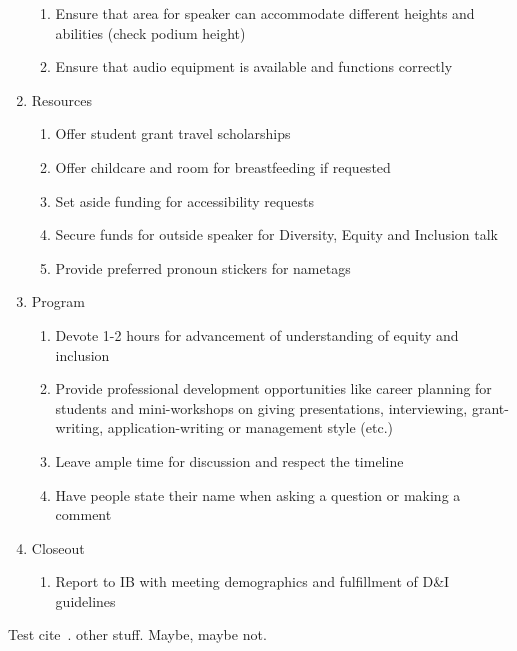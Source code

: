 \documentclass{article}
\begin{document}
\begin{enumerate}
\begin{enumerate}[label=\alph*.]
      \item Ensure that area for speaker can accommodate different heights and abilities (check podium height)
      \item Ensure that audio equipment is available and functions correctly
    \end{enumerate}
    \item Resources
    \begin{enumerate}[label=\alph*.]
      \item Offer student grant travel scholarships
      \item Offer childcare and room for breastfeeding if requested
      \item Set aside funding for accessibility requests
      \item Secure funds for outside speaker for Diversity, Equity and Inclusion talk
      \item Provide preferred pronoun stickers for nametags
    \end{enumerate}
    \item Program
    \begin{enumerate}[label=\alph*.]
      \item Devote 1-2 hours for advancement of understanding of equity and inclusion
      \item Provide professional development opportunities like career planning for students and mini-workshops on giving presentations, interviewing, grant-writing, application-writing or management style (etc.)
      \item Leave ample time for discussion and respect the timeline
      \item Have people state their name when asking a question or making a comment
    \end{enumerate}
    \item Closeout
    \begin{enumerate}[label=\alph*.]
      \item Report to IB with meeting demographics and fulfillment of D&I guidelines
    \end{enumerate}
  \end{enumerate}

  Test cite~\cite{AudioAccessibility, TheAtlantic, DCMP, ReelWords, A11yNYC, Wired, AngryDeafPeople}.
  other stuff. Maybe, maybe not.
  \printbibliography
\end{document}
